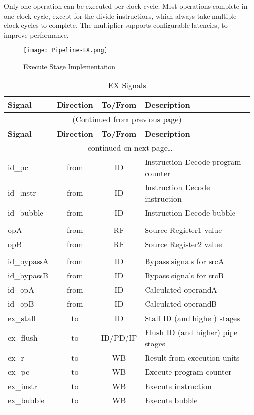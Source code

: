 Only one operation can be executed per clock cycle.
Most operations complete in one clock cycle, except for the divide instructions, which always take multiple clock cycles to complete. The multiplier supports configurable latencies, to improve performance.


\begin{figure}[h]
  \texttt{[image: Pipeline-EX.png]}
  \caption{Execute Stage Implementation}
\end{figure}

\begin{longtable}[]{@{}lccl@{}}
	\toprule
	\textbf{Signal} & \textbf{Direction} & \textbf{To/From} & \textbf{Description}\tabularnewline
	\midrule
	\endfirsthead
	\multicolumn{4}{c}{{(Continued from previous page)}} \\
	\toprule
	\textbf{Signal} & \textbf{Direction} & \textbf{To/From} & \textbf{Description}\tabularnewline
	\midrule
	\endhead
	\midrule \multicolumn{4}{c}{{\tablename\ \thetable{} continued on next page\ldots}} \\
	\endfoot
	\endlastfoot
	
		id\_pc & from & ID & Instruction Decode program counter\\
		id\_instr & from & ID & Instruction Decode instruction\\
		id\_bubble & from & ID & Instruction Decode bubble\\
		 &  &  & \\
		opA & from & RF & Source Register1 value\\
		opB & from & RF & Source Register2 value\\
		 &  &  & \\
		id\_bypassA & from & ID & Bypass signals for srcA\\
		id\_bypassB & from & ID & Bypass signals for srcB\\
		id\_opA & from & ID & Calculated operandA\\
		id\_opB & from & ID & Calculated operandB\\
		ex\_stall & to & ID & Stall ID (and higher) stages\\
		ex\_flush & to & ID/PD/IF & Flush ID (and higher) pipe stages\\
		ex\_r & to & WB & Result from execution units\\
		ex\_pc & to & WB & Execute program counter\\
		ex\_instr & to & WB & Execute instruction\\
		ex\_bubble & to & WB & Execute bubble\\
	\bottomrule
	\caption{EX Signals}
	\label{tab:ex-signals}
\end{longtable}

